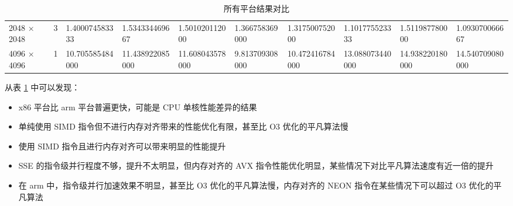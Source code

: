 \documentclass[a4paper]{article}
\begin{document}
\begin{table}[]
{\begin{tabular}{llllllllll}
      2048 × 2048 & 3             & 1.400074583333   & 1.534334469667        & 1.501020112000      & 1.366758369000        & 1.317500752000      & 1.101775523333   & 1.511987780000         & 1.093070066667       \\
      4096 × 4096 & 1             & 10.705585484000  & 11.438922085000       & 11.608043578000     & 9.813709308000        & 10.472416784000     & 13.088073440000  & 14.938220180000        & 14.540709080000
    \end{tabular}%
  }
  \caption{所有平台结果对比}
  \label{tab:result}
\end{table}

从表 \ref{tab:result} 中可以发现：
\begin{itemize}
  \item x86 平台比 arm 平台普遍更快，可能是 CPU 单核性能差异的结果
  \item 单纯使用 SIMD 指令但不进行内存对齐带来的性能优化有限，甚至比 O3 优化的平凡算法慢
  \item 使用 SIMD 指令且进行内存对齐可以带来明显的性能提升
  \item SSE 的指令级并行程度不够，提升不太明显，但内存对齐的 AVX 指令性能优化明显，某些情况下对比平凡算法速度有近一倍的提升
  \item 在 arm 中，指令级并行加速效果不明显，甚至比 O3 优化的平凡算法慢，内存对齐的 NEON 指令在某些情况下可以超过 O3 优化的平凡算法
\end{itemize}


% 
% 
\end{document}
